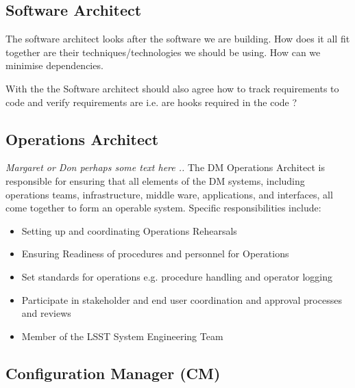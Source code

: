 \subsection{Software Architect \label{role:softarc}}
The software architect looks after the software we are building. How does it all fit together are their techniques/technologies we should be using. How can we minimise dependencies. 

With the  the Software architect should also agree how to track requirements to code and verify requirements are i.e. are hooks required in the code ?

\subsection{Operations Architect \label{role:opsarc}}
{\em Margaret  or Don perhaps some text here .. }
The DM Operations  Architect is responsible for ensuring that all elements of the DM systems, including operations teams, infrastructure, middle ware, applications, and interfaces, 
all come together to form an operable system. 
Specific responsibilities include:
\begin{itemize}
\item Setting up and coordinating  Operations Rehearsals
\item Ensuring Readiness of procedures and personnel for Operations
\item Set standards for operations e.g. procedure handling and operator logging
\item Participate in stakeholder and end user coordination and approval processes and reviews
\item Member of the LSST System Engineering Team
\end{itemize}


\subsection{Configuration Manager (CM)}\label{role:cm}

